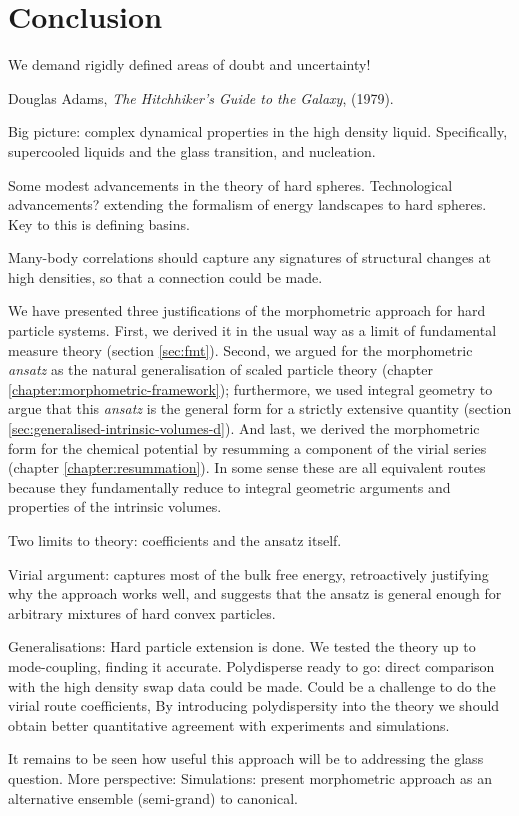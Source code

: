 \documentclass[11pt,twoside]{report}
\begin{document}
\chapter{Conclusion}
\epigraph{We demand rigidly defined areas of doubt and uncertainty!}{Douglas Adams, \emph{The Hitchhiker's Guide to the Galaxy}, (1979).}

Big picture: complex dynamical properties in the high density liquid.
Specifically, supercooled liquids and the glass transition, and nucleation.

Some modest advancements in the theory of hard spheres.
Technological advancements? extending the formalism of energy landscapes to hard spheres.
Key to this is defining basins.

Many-body correlations should capture any signatures of structural changes at high densities, so that a connection could be made.

We have presented three justifications of the morphometric approach for hard particle systems.
First, we derived it in the usual way as a limit of fundamental measure theory (section \ref{sec:fmt}).
Second, we argued for the morphometric \emph{ansatz} as the natural generalisation of scaled particle theory (chapter \ref{chapter:morphometric-framework}); furthermore, we used integral geometry to argue that this \emph{ansatz} is the general form for a strictly extensive quantity (section \ref{sec:generalised-intrinsic-volumes-d}).
And last, we derived the morphometric form for the chemical potential by resumming a component of the virial series (chapter \ref{chapter:resummation}).
In some sense these are all equivalent routes because they fundamentally reduce to integral geometric arguments and properties of the intrinsic volumes.

Two limits to theory: coefficients and the ansatz itself.

Virial argument: captures most of the bulk free energy, retroactively justifying why the approach works well, and suggests that the ansatz is general enough for arbitrary mixtures of hard convex particles.

Generalisations:
Hard particle extension is done.
We tested the theory up to mode-coupling, finding it accurate.
Polydisperse ready to go: direct comparison with the high density swap data could be made.
Could be a challenge to do the virial route coefficients, 
By introducing polydispersity into the theory we should obtain better quantitative agreement with experiments and simulations.

It remains to be seen how useful this approach will be to addressing the glass question.
More perspective:
Simulations: present morphometric approach as an alternative ensemble (semi-grand) to canonical.
\end{document}
